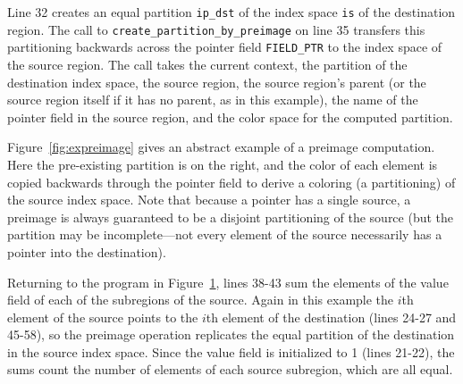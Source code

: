 Line 32 creates an equal partition {\tt ip\_dst} of the index space {\tt is} of the destination region.  The call to {\tt create\_partition\_by\_preimage} on line 35 transfers this partitioning backwards across the pointer field {\tt FIELD\_PTR} to the index space of the source region.  The call takes the current context, the partition of the destination index space, the source region, the source region's parent (or the source region itself if it has no parent, as in this example), the name of the pointer field in the source region, and the color space for the computed partition.

Figure~\ref{fig:expreimage} gives an abstract example of a preimage computation.  Here the pre-existing partition is on the right, and the color of each element is copied backwards through the pointer field to derive a coloring (a partitioning) of the source index space.  Note that because a pointer has a single source, a preimage is always guaranteed to be a disjoint partitioning of the source (but the partition may be incomplete---not every element of the source necessarily has a pointer into the destination).

Returning to the program in Figure~\ref{fig:preimage}, lines 38-43 sum the elements of the value field of each of the subregions of the source.  Again in this example the $i$th element of the source points to the $i$th element of the destination (lines 24-27 and 45-58), so the preimage operation replicates the equal partition of the destination in the source index space.  Since the value field is initialized to 1 (lines 21-22), the sums count the number of elements of each source subregion, which are all equal.


\begin{figure}
  {\small
   
  }
  \caption{}
  \label{fig:preimage}
\end{figure}

